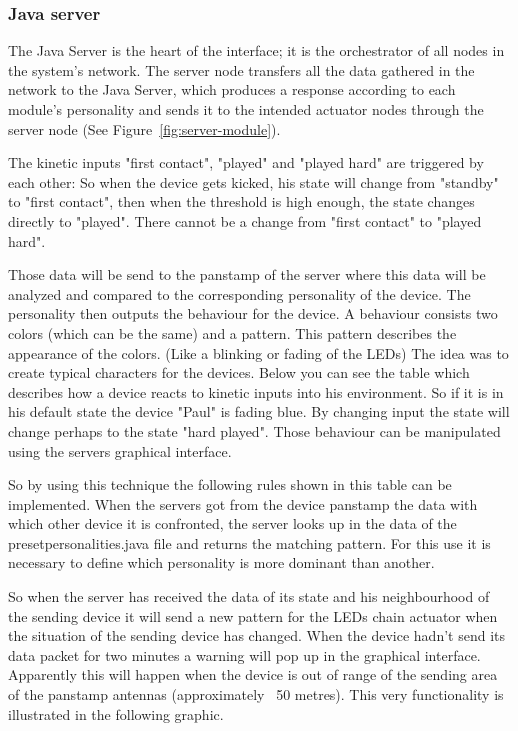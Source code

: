 \subsubsection{Java server}

The Java Server is the heart of the interface; it is the orchestrator of all nodes in the system's network. The server node transfers all the data gathered in the network to the Java Server, which produces a response according to each module's personality and sends it to the intended actuator nodes through the server node (See Figure~\ref{fig:server-module}).  



The kinetic inputs "first contact", "played" and "played hard" are triggered by each other:
So when the device gets kicked, his state will change from "standby" to "first contact", then when the threshold is high enough, the state changes directly to "played". There cannot be a change from "first contact" to "played hard". 

Those data will be send to the panstamp of the server where this data will be analyzed and compared to the corresponding personality of the device. The personality then outputs the behaviour for the device. A behaviour consists two colors (which can be the same) and a pattern. This pattern describes the appearance of the colors. (Like a blinking or fading of the LEDs)
The idea was to create typical characters for the devices. Below you can see the table which describes how a device reacts to kinetic inputs into his environment. So if it is in his default state the device "Paul" is fading blue. By changing input the state will change perhaps to the state "hard played". Those behaviour can be manipulated using the servers graphical interface. 


So by using this technique the following rules shown in this table can be implemented.
When the servers got from the device panstamp the data with which other device it is confronted, the server looks up in the data of the presetpersonalities.java file and returns the matching pattern. For this use it is necessary to define which personality is more dominant than another.


So when the server has received the data of its state and his neighbourhood of the sending device it will send a new pattern for the LEDs chain actuator when the situation of the sending device has changed.
When the device hadn't send its data packet for two minutes a warning will pop up in the graphical interface. Apparently this will happen when the device is out of range of the sending area of the panstamp antennas (approximately ~50 metres).
This very functionality is illustrated in the following graphic.



